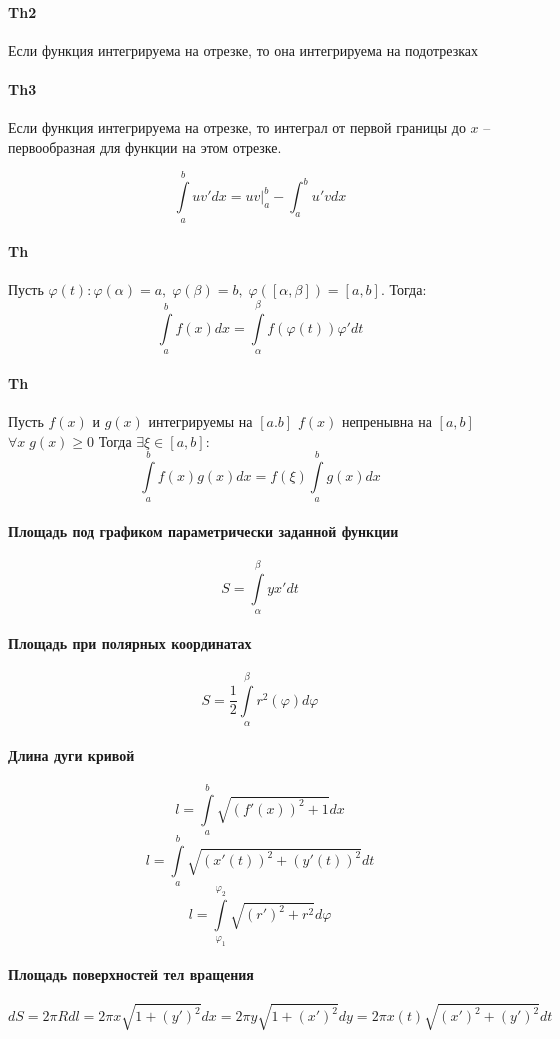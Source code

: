 \documentclass{article}
\begin{document}
\paragraph*{Th2} Если функция интегрируема на отрезке, то она интегрируема на подотрезках
\paragraph*{Th3} Если функция интегрируема на отрезке, то интеграл от первой границы до $x$ -- первообразная для функции на этом отрезке.

$$ \int\limits_a^b u v' dx = uv|_a^b - \int_a^b u'v dx $$

\paragraph*{Th} Пусть $\varphi(t) : \varphi(\alpha ) = a, \; \varphi(\beta) = b, \; \varphi([\alpha, \beta])=[a,b]$. Тогда:
$$ \int\limits_a^b f(x) dx = \int\limits_\alpha^\beta f(\varphi(t))\varphi' dt $$

\paragraph*{Th} Пусть $f(x)$ и $g(x)$ интегрируемы на $[a.b]$ $f(x)$ непренывна на $[a,b]$ $\forall x \; g(x) \geq 0$ Тогда $\exists \xi \in [a,b]:$
$$ \int\limits_a^b f(x) g(x) dx = f(\xi) \int\limits_a^b g(x)dx   $$
\newpage
\paragraph*{Площадь под графиком параметрически заданной функции}
$$ S = \int\limits_\alpha^\beta y x'dt $$
\paragraph*{Площадь при полярных координатах}
$$ S = \frac{1}{2}\int\limits_\alpha^\beta r^2(\varphi) d\varphi $$
\paragraph*{Длина дуги кривой}
$$ l = \int\limits_a^b \sqrt{(f'(x))^2 + 1} dx $$
$$ l = \int \limits_a^b \sqrt{(x'(t))^2+(y'(t))^2} dt$$
$$ l = \int\limits_{\varphi_1}^{\varphi_2}\sqrt{(r')^2 + r^2} d \varphi$$
\paragraph*{Площадь поверхностей тел вращения}
$$ dS = 2\pi R dl = 2\pi x\sqrt{1 + (y')^2}dx =  2\pi y\sqrt{1 + (x')^2}dy =  2\pi x(t)\sqrt{(x')^2 + (y')^2}dt $$
\newpage
\end{document}
